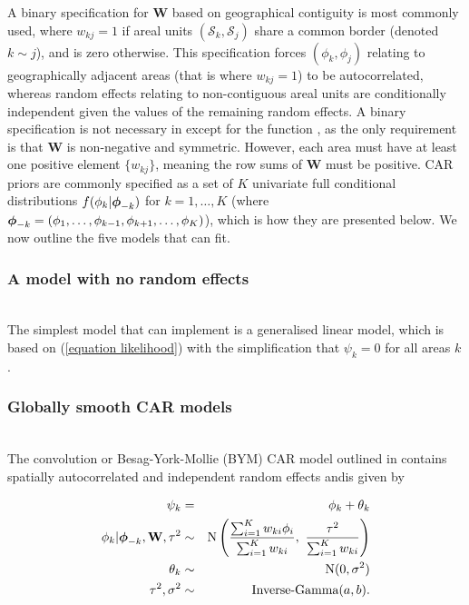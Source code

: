 \documentclass[article,shortnames,nojss]{jss}
\newcommand{\bd}[1]{\ensuremath{\mbox{\boldmath $#1$}}}
\begin{document}
\hspace{1cm} A binary specification for  $\mathbf{W}$ based on geographical contiguity is most commonly used, where $w_{kj}=1$ if areal units $(\mathcal{S}_k, \mathcal{S}_j)$ share a common border (denoted $k\sim j$), and is zero otherwise. This specification forces $(\phi_k, \phi_j)$ relating to geographically adjacent areas (that is where $w_{kj}=1$) to be autocorrelated, whereas random effects relating to non-contiguous areal units are conditionally independent given the values of the remaining random effects. A binary specification is not necessary in  except for the function , as the only requirement is that $\mathbf{W}$ is non-negative and symmetric. However, each area must have at least one positive element $\{w_{kj}\}$, meaning the row sums of $\mathbf{W}$  must be positive. CAR priors are commonly specified as a set of $K$ univariate full conditional distributions $f(\phi_{k}|\bd{\phi}_{-k})$ for $k=1,\ldots,K$ (where $\bd{\phi}_{-k}=(\phi_{1},\ldots,\phi_{k-1},\phi_{k+1},\ldots,\phi_{K})$), which is how they are presented below. We now outline the five models that  can fit.\\

\subsubsection{A model with no random effects}
\\
The simplest model that  can implement is a generalised linear model, which is based on (\ref{equation likelihood}) with the simplification that $\psi_k=0$ for all areas $k$. 

\subsubsection{Globally smooth CAR models}
\\
The  convolution or Besag-York-Mollie (BYM) CAR model outlined in \cite{besag1991} contains spatially autocorrelated and independent random effects andis given by 


\begin{eqnarray}
\psi_k&=&\phi_{k} + \theta_k\label{equation intrinsic}\\
\phi_{k}| \bd{\phi}_{-k},\mathbf{W},\tau^2&\sim&\mbox{N}\left(\frac{\sum_{i=1}^{K}w_{ki}\phi_{i}}{\sum_{i=1}^{K}w_{ki}},~
\frac{\tau^{2}}{\sum_{i=1}^{K}w_{ki}}\right)\nonumber\\
\theta_k&\sim&\mbox{N}(0, \sigma^2)\nonumber\\
\tau^{2}, \sigma^2&\sim&\mbox{Inverse-Gamma}(a, b).\nonumber
\end{eqnarray}
\end{document}

